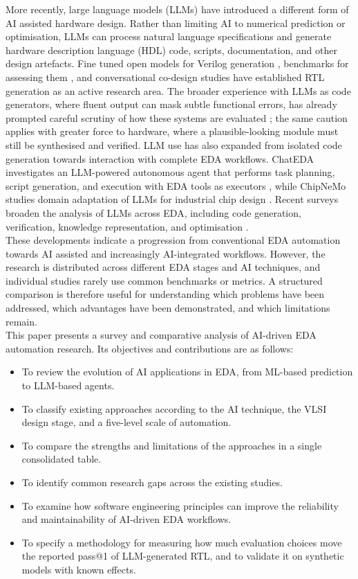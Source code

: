 \documentclass[conference]{IEEEtran}
\begin{document}
\noindent More recently, large language models (LLMs) have introduced a different form of AI assisted hardware design. Rather than limiting AI to numerical prediction or optimisation, LLMs can process natural language specifications and generate hardware description language (HDL) code, scripts, documentation, and other design artefacts. Fine tuned open models for Verilog generation \cite{P11_Thakur2024,P4_Liu2025}, benchmarks for assessing them \cite{P12_Liu2023,P15_Pinckney2025}, and conversational co-design studies \cite{P13_Blocklove2023} have established RTL generation as an active research area. The broader experience with LLMs as code generators, where fluent output can mask subtle functional errors, has already prompted careful scrutiny of how these systems are evaluated \cite{10.1007/s10844-025-00968-y}; the same caution applies with greater force to hardware, where a plausible-looking module must still be synthesised and verified. LLM use has also expanded from isolated code generation towards interaction with complete EDA workflows. ChatEDA investigates an LLM-powered autonomous agent that performs task planning, script generation, and execution with EDA tools as executors \cite{P5_Wu2024}, while ChipNeMo studies domain adaptation of LLMs for industrial chip design \cite{P14_Liu2023ChipNeMo}. Recent surveys broaden the analysis of LLMs across EDA, including code generation, verification, knowledge representation, and optimisation \cite{P6_Pan2025,P7_He2025}.\\

\noindent These developments indicate a progression from conventional EDA automation towards AI assisted and increasingly AI-integrated workflows. However, the research is distributed across different EDA stages and AI techniques, and individual studies rarely use common benchmarks or metrics. A structured comparison is therefore useful for understanding which problems have been addressed, which advantages have been demonstrated, and which limitations remain.\\

\noindent This paper presents a survey and comparative analysis of AI-driven EDA automation research. Its objectives and contributions are as follows:
\begin{itemize}
    \item To review the evolution of AI applications in EDA, from ML-based prediction to LLM-based agents.
    \item To classify existing approaches according to the AI technique, the VLSI design stage, and a five-level scale of automation.
    \item To compare the strengths and limitations of the approaches in a single consolidated table.
    \item To identify common research gaps across the existing studies.
    \item To examine how software engineering principles can improve the reliability and maintainability of AI-driven EDA workflows.
    \item To specify a methodology for measuring how much evaluation choices move the reported pass@1 of LLM-generated RTL, and to validate it on synthetic models with known effects.
\end{itemize}
\end{document}

